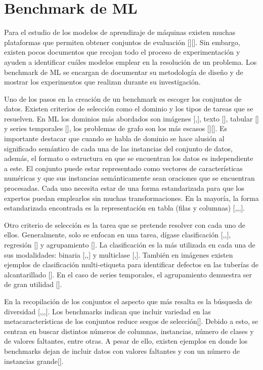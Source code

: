 \section{Benchmark de ML}\label{section:bench_ML}
Para el estudio de los modelos de aprendizaje de máquinas existen muchas plataformas que permiten obtener conjuntos de evaluación [\cite{43}][\cite{45}]. 
Sin embargo, existen pocos documentos que recojan todo el proceso de experimentación y ayuden a identificar cuáles modelos emplear en la resolución de un problema. 
Los benchmark de ML se encargan de documentar su metodología de diseño y de mostrar los experimentos que realizan durante su investigación. 

Uno de los pasos en la creación de un benchmark es escoger los conjuntos de datos. Existen criterios de selección como el dominio y los tipos de tareas que se resuelven. 
En ML los dominios más abordados son imágenes [\cite{1},\cite{3}], texto [\cite{4}], tabular [\cite{2}] y series temporales [\cite{7}], los problemas de grafo son los más escasos 
[\cite{5}][\cite{6}]. 
Es importante destacar que cuando se habla de dominio se hace alusión al significado semántico de cada una de las instancias del conjunto de datos, además, el formato o estructura en que se 
encuentran los datos es independiente a este. El conjunto puede estar representado como vectores de características numéricas y que sus instancias semánticamente sean oraciones que se encuentran 
procesadas. Cada uno necesita estar de una forma estandarizada para que los expertos puedan emplearlos sin muchas transformaciones. En la mayoría, la forma estandarizada 
encontrada es la representación en tabla (filas y columnas) [\cite{4},\cite{1},\cite{3},\cite{2}].

Otro criterio de selección es la tarea que se pretende resolver con cada uno de ellos. Generalmente, solo se enfocan en una tarea, dígase clasificación 
[\cite{4},\cite{1},\cite{3}], regresión [\cite{6}] y agrupamiento [\cite{7}]. La clasificación es la más utilizada en cada una de sus modalidades: binaria 
[\cite{4},\cite{2},\cite{5}] y multiclase [\cite{2},\cite{5}]. También en imágenes existen ejemplos de clasificación multi-etiqueta para identificar 
defectos en las tuberías de alcantarillado [\cite{3}]. En el caso de series temporales, el agrupamiento demuestra ser de gran utilidad [\cite{7}].

En la recopilación de los conjuntos el aspecto que más resalta es la búsqueda de diversidad [\cite{4},\cite{2},\cite{6},\cite{7}]. Los benchmarks indican que incluir 
variedad en las metacaracterísticas de los conjuntos reduce sesgos de selección[\cite{2}]. Debido a esto, se centran en buscar distintos números de columnas, instancias, 
número de clases y de valores faltantes, entre otras. A pesar de ello, existen ejemplos en donde los benchmarks dejan de incluir datos con valores faltantes y 
con un número de instancias grande[\cite{2}].

